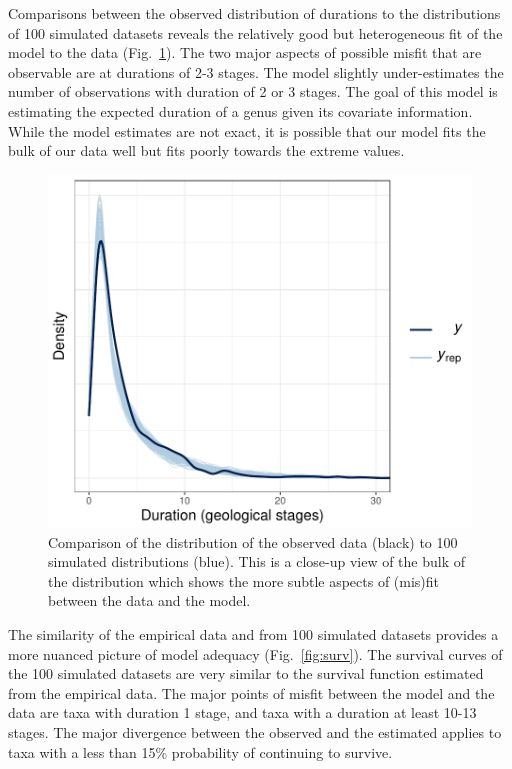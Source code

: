 \documentclass[11pt]{article}
\begin{document}

Comparisons between the observed distribution of durations to the distributions of 100 simulated datasets reveals the relatively good but heterogeneous fit of the model to the data (Fig.~\ref{fig:dens_overlay_zoom}). The two major aspects of possible misfit that are observable are at durations of 2-3 stages. The model slightly under-estimates the number of observations with duration of 2 or 3 stages. The goal of this model is estimating the expected duration of a genus given its covariate information. While the model estimates are not exact, it is possible that our model fits the bulk of our data well but fits poorly towards the extreme values.

\begin{figure}[ht]
  \centering
  \includegraphics[height = 0.5\textheight,width=\textwidth,keepaspectratio=true]{figure/ppc_dens_zoom_cweib_cens}
  \caption{ Comparison of the distribution of the observed data (black) to 100 simulated distributions (blue). This is a close-up view of the bulk of the distribution which shows the more subtle aspects of (mis)fit between the data and the model. }
  \label{fig:dens_overlay_zoom}
\end{figure}


The similarity of the empirical data and from 100 simulated datasets provides a more nuanced picture of model adequacy (Fig.~\ref{fig:surv}). The survival curves of the 100 simulated datasets are very similar to the survival function estimated from the empirical data. The major points of misfit between the model and the data are taxa with duration 1 stage, and taxa with a duration at least 10-13 stages. The major divergence between the observed and the estimated applies to taxa with a less than 15\% probability of continuing to survive. 
\end{document}
